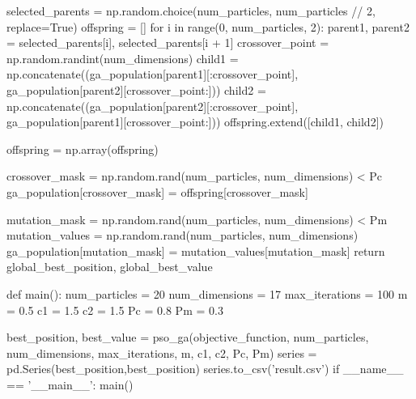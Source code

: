 \documentclass{article}
\numberwithin{equation}{subsection}
\begin{document}
\begin{python}
        selected_parents = np.random.choice(num_particles, num_particles // 2, replace=True)
        offspring = []
        for i in range(0, num_particles, 2):
            parent1, parent2 = selected_parents[i], selected_parents[i + 1]
            crossover_point = np.random.randint(num_dimensions)
            child1 = np.concatenate((ga_population[parent1][:crossover_point], ga_population[parent2][crossover_point:]))
            child2 = np.concatenate((ga_population[parent2][:crossover_point], ga_population[parent1][crossover_point:]))
            offspring.extend([child1, child2])

        offspring = np.array(offspring)

        crossover_mask = np.random.rand(num_particles, num_dimensions) < Pc
        ga_population[crossover_mask] = offspring[crossover_mask]

        mutation_mask = np.random.rand(num_particles, num_dimensions) < Pm
        mutation_values = np.random.rand(num_particles, num_dimensions)
        ga_population[mutation_mask] = mutation_values[mutation_mask]
    return global_best_position, global_best_value


def main():
    num_particles = 20
    num_dimensions = 17
    max_iterations = 100
    m = 0.5
    c1 = 1.5
    c2 = 1.5
    Pc = 0.8
    Pm = 0.3

    best_position, best_value = pso_ga(objective_function, num_particles, num_dimensions, max_iterations,
                                       m, c1, c2, Pc, Pm)
    series = pd.Series(best_position,best_position)
    series.to_csv('result.csv')
if __name__ == '__main__':
    main()
\end{python}
\end{document}
